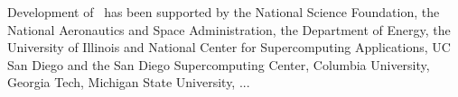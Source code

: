
\acknowledgments

Development of \enzo\ has been supported by the National Science Foundation, the National Aeronautics and Space Administration, the Department of Energy, the University of Illinois and National Center for Supercomputing Applications, UC San Diego and the San Diego Supercomputing Center, Columbia University, Georgia Tech, Michigan State University, ...  